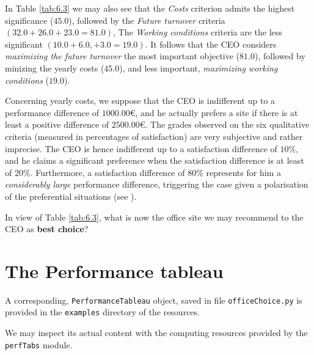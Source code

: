 In Table \ref{tab:6.3} we may also see that the \emph{Costs} criterion admits the highest significance ($45.0$), followed by the \emph{Future turnover} criteria $(32.0 + 26.0 + 23.0 = 81.0)$, The \emph{Working conditions} criteria are the less significant $(10.0 + 6.0, + 3.0 = 19.0)$. It follows that the CEO considers \emph{maximizing the future turnover} the most important objective ($81.0$), followed by minizing the yearly costs ($45.0$), and less important, \emph{maximizing working conditions} ($19.0$). 

Concerning yearly costs, we suppose that the CEO is indifferent up to a performance difference of $1000.00$€, and he actually prefers a site if there is at least a positive difference of $2500.00$€. The grades observed on the six qualitative criteria (measured in percentages of satisfaction) are very subjective and rather imprecise. The CEO is hence indifferent up to a satisfaction difference of $10\%$, and he claims a significant preference when the satisfaction difference is at least of $20\%$.  Furthermore, a satisfaction difference of $80\%$ represents for him a \emph{considerably large} performance difference, triggering the case given a polarisation of the preferential situations (see \citet{BIS-2013}). 

In view of Table \ref{tab:6.3}, what is now the office site we may recommend to the CEO as \textbf{best choice}?

\section{The \Digraph Performance tableau}
\label{sec:6.2}


A corresponding, \texttt{PerformanceTableau} object, saved in file \texttt{officeChoice.py} is provided in the \texttt{examples} directory of the \Digraph resources. 

We may inspect its actual content with the computing resources provided by the \texttt{perfTabs} module.

